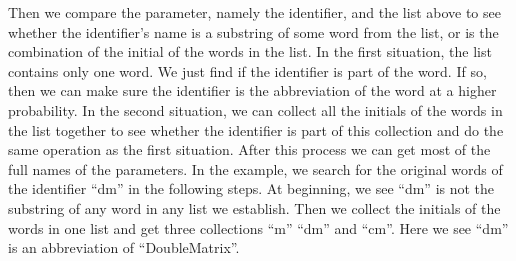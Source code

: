 Then we compare the parameter, namely the identifier, and the list above to see whether the identifier's name is a substring of
some word from the list, or is the combination of the initial of the words in the list. In the first situation, the list contains only one
word. We just find if the identifier is part of the word. If so, then we can make sure the identifier is the abbreviation of the word at a higher probability. In the second situation, we can collect all the initials of the words in the list together to see whether the identifier is part of this collection and do the same operation as the first situation.
After this process we can get most of the full names of the parameters.
In the example, we search for the original words of the identifier ``dm'' in the following steps. At beginning, we see ``dm'' is not the substring of any word in any list we establish. Then we collect the initials of the words in one list and get three collections ``m'' ``dm'' and ``cm''. Here we see ``dm'' is an abbreviation of ``DoubleMatrix''.


%
%
%


